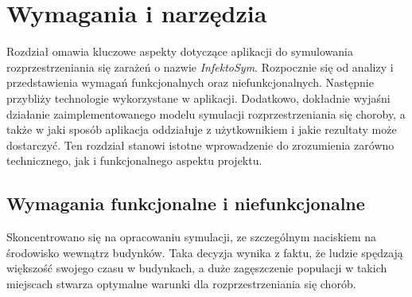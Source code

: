 \chapter{Wymagania i narzędzia}
\label{ch:wymagania-i-narzedzia}
Rozdział omawia kluczowe aspekty dotyczące aplikacji do symulowania rozprzestrzeniania się zarażeń o nazwie \textit{InfektoSym}. Rozpocznie się od analizy i przedstawienia wymagań funkcjonalnych oraz niefunkcjonalnych. Następnie przybliży technologie wykorzystane w aplikacji. Dodatkowo, dokładnie wyjaśni działanie zaimplementowanego modelu symulacji rozprzestrzeniania się choroby, a także w jaki sposób aplikacja oddziałuje z użytkownikiem i jakie rezultaty może dostarczyć. Ten rozdział stanowi istotne wprowadzenie do zrozumienia zarówno technicznego, jak i funkcjonalnego aspektu projektu.

\section{\textbf{Wymagania funkcjonalne i niefunkcjonalne}}

Skoncentrowano się na opracowaniu symulacji, ze szczególnym naciskiem na środowisko wewnątrz budynków. Taka decyzja wynika z faktu, że ludzie spędzają większość swojego czasu w budynkach, a duże zagęszczenie populacji w takich miejscach stwarza optymalne warunki dla rozprzestrzeniania się chorób.

